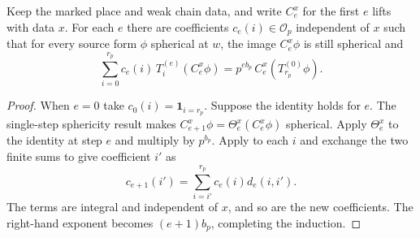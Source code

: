 \begin{lemma}
\label{lem:a-marked-hecke-chain-transfer}
\emitthmsource
Keep the marked place and weak chain data, and write $C_e^x$ for the first $e$ lifts with data $x$. For each $e$ there are coefficients $c_e(i)\in\mathcal O_p$ independent of $x$ such that for every source form $\phi$ spherical at $w$, the image $C_e^x\phi$ is still spherical and
\[
 \sum_{i=0}^{r_p}c_e(i)\,T_i^{(e)}(C_e^x\phi)
     =p^{e b_p}\,C_e^x(T_{r_p}^{(0)}\phi).
\]
\end{lemma}
\begin{proof}
When $e=0$ take $c_0(i)=\mathbf 1_{i=r_p}$. Suppose the identity holds for $e$. The single-step sphericity result makes $C_{e+1}^x\phi=\Theta_e^x(C_e^x\phi)$ spherical. Apply $\Theta_e^x$ to the identity at step $e$ and multiply by $p^{b_p}$. Apply  to each $i$ and exchange the two finite sums to give coefficient $i'$ as
\[
 c_{e+1}(i')=\sum_{i=i'}^{r_p}c_e(i)d_e(i,i').
\]
The terms are integral and independent of $x$, and so are the new coefficients. The right-hand exponent becomes $(e+1)b_p$, completing the induction.
\end{proof}

